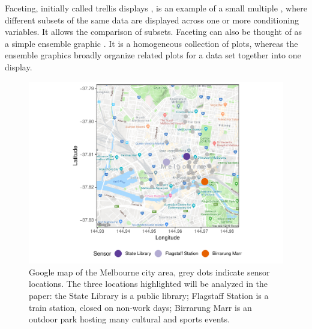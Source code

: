 \documentclass[12pt]{article}
\begin{document}
Faceting, initially called trellis displays \citep{becker_visual_1996}, is an example of a small multiple \citep{tufte1983visual}, where different subsets of the same data are displayed across one or more conditioning variables. It allows the comparison of subsets. Faceting can also be thought of as a simple ensemble graphic \citep{unwin_ensemble_2018}. It is a homogeneous collection of plots, whereas the ensemble graphics broadly organize related plots for a data set together into one display.

\begin{figure}

{\centering \includegraphics[width=0.7\linewidth]{figure/ped-map-1} 

}

\caption{Google map of the Melbourne city area, grey dots indicate sensor locations. The three locations highlighted will be analyzed in the paper: the State Library is a public library; Flagstaff Station is a train station, closed on non-work days; Birrarung Marr is an outdoor park hosting many cultural and sports events.}\label{fig:ped-map}
\end{figure}
\end{document}
